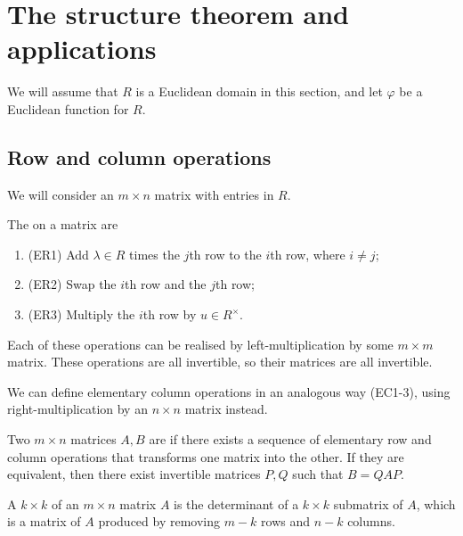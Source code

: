 \section{The structure theorem and applications}
We will assume that $R$ is a Euclidean domain in this section, and let $\varphi$ be a Euclidean function for $R$.
\subsection{Row and column operations}

We will consider an $m \times n$ matrix with entries in $R$.

\begin{definition}
	The  on a matrix are
	\begin{enumerate}
		\item (ER1) Add $\lambda \in R$ times the $j$th row to the $i$th row, where $i \neq j$;
		\item (ER2) Swap the $i$th row and the $j$th row;
		\item (ER3) Multiply the $i$th row by $u \in R^\times$.
	\end{enumerate}
\end{definition}

\begin{remark}
	Each of these operations can be realised by left-multiplication by some $m \times m$ matrix.
	These operations are all invertible, so their matrices are all invertible.

	We can define elementary column operations in an analogous way (EC1-3), using right-multiplication by an $n \times n$ matrix instead.
\end{remark} 

\begin{definition}[Equivalent]
	Two $m \times n$ matrices $A, B$ are  if there exists a sequence of elementary row and column operations that transforms one matrix into the other.
	If they are equivalent, then there exist invertible matrices $P, Q$ such that $B = QAP$.
\end{definition}

\begin{definition}[Minor]
	A $k \times k$  of an $m \times n$ matrix $A$ is the determinant of a $k \times k$ submatrix of $A$, which is a matrix of $A$ produced by removing $m-k$ rows and $n-k$ columns.
\end{definition}

